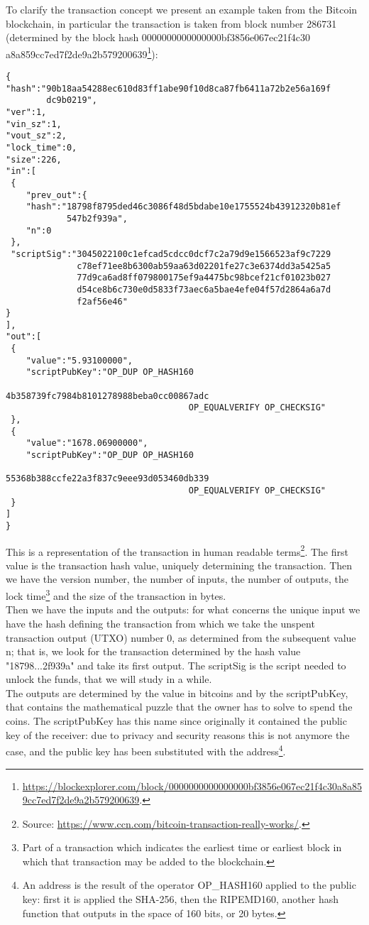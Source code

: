 \bigskip
\noindent
To clarify the transaction concept we present an example taken from the Bitcoin blockchain, in particular the transaction is taken from block number 286731 (determined by the block hash 0000000000000000bf3856e067ec21f4c30 a8a859cc7ed7f2de9a2b579200639\footnote{\url{https://blockexplorer.com/block/0000000000000000bf3856e067ec21f4c30a8a859cc7ed7f2de9a2b579200639}.}):

\bigskip

\begin{lstlisting}[frame=single]
{
"hash":"90b18aa54288ec610d83ff1abe90f10d8ca87fb6411a72b2e56a169f
        dc9b0219",
"ver":1,
"vin_sz":1,
"vout_sz":2,
"lock_time":0,
"size":226,
"in":[
 {
	"prev_out":{
	"hash":"18798f8795ded46c3086f48d5bdabe10e1755524b43912320b81ef
	        547b2f939a",
	"n":0
 },
 "scriptSig":"3045022100c1efcad5cdcc0dcf7c2a79d9e1566523af9c7229
              c78ef71ee8b6300ab59aa63d02201fe27c3e6374dd3a5425a5
              77d9ca6ad8ff079800175ef9a4475bc98bcef21cf01023b027
              d54ce8b6c730e0d5833f73aec6a5bae4efe04f57d2864a6a7d
              f2af56e46"
}
],
"out":[
 {
	"value":"5.93100000",
	"scriptPubKey":"OP_DUP OP_HASH160
	 								4b358739fc7984b8101278988beba0cc00867adc
	 								OP_EQUALVERIFY OP_CHECKSIG"
 },
 {
	"value":"1678.06900000",
	"scriptPubKey":"OP_DUP OP_HASH160
	 								55368b388ccfe22a3f837c9eee93d053460db339
	 								OP_EQUALVERIFY OP_CHECKSIG"
 }
]
}
\end{lstlisting}

\bigskip
\noindent
This is a representation of the transaction in human readable terms\footnote{Source: \url{https://www.ccn.com/bitcoin-transaction-really-works/}.}. The first value is the transaction hash value, uniquely determining the transaction. Then we have the version number, the number of inputs, the number of outputs, the lock time\footnote{Part of a transaction which indicates the earliest time or earliest block in which that transaction may be added to the blockchain.} and the size of the transaction in bytes.
\\
Then we have the inputs and the outputs: for what concerns the unique input we have the hash defining the transaction from which we take the unspent transaction output (UTXO) number 0, as determined from the subsequent value n; that is, we look for the transaction determined by the hash value "18798...2f939a" and take its first output. The scriptSig is the script needed to unlock the funds, that we will study in a while.
\\
The outputs are determined by the value in bitcoins and by the scriptPubKey, that contains the mathematical puzzle that the owner has to solve to spend the coins. The scriptPubKey has this name since originally it contained the public key of the receiver: due to privacy and security reasons this is not anymore the case, and the public key has been substituted with the address\footnote{An address is the result of the operator OP\_HASH160 applied to the public key: first it is applied the SHA-256, then the RIPEMD160, another hash function that outputs in the space of 160 bits, or 20 bytes.}.

